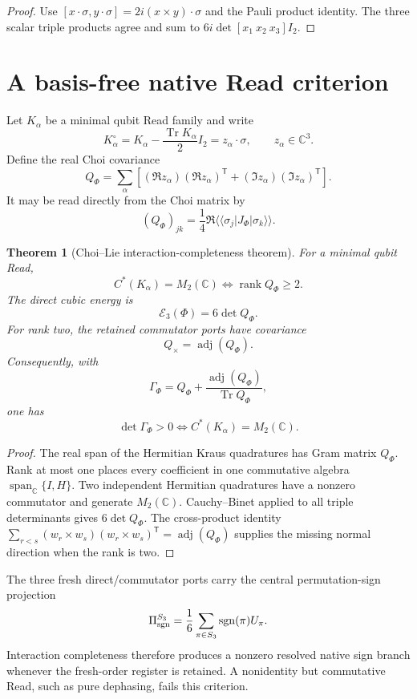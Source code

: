 \documentclass[11pt,oneside,openany]{book}
\numberwithin{equation}{chapter}
\newtheorem{theorem}{Theorem}[chapter]
\theoremstyle{definition}
\theoremstyle{remark}
\newcommand{\C}{\mathbb C}
\newcommand{\Tr}{\operatorname{Tr}}
\newcommand{\rank}{\operatorname{rank}}
\newcommand{\Span}{\operatorname{span}}
\newcommand{\sgn}{\operatorname{sgn}}
\newcommand{\adj}{\operatorname{adj}}
\begin{document}
\begin{proof}
Use \([x\cdot\sigma,y\cdot\sigma]=2i(x\times y)\cdot\sigma\) and the Pauli
product identity.  The three scalar triple products agree and sum to
\(6i\det[x_1\ x_2\ x_3]I_2\).
\end{proof}

\section{A basis-free native Read criterion}
Let \(K_\alpha\) be a minimal qubit Read family and write
\[
 K_\alpha^\circ
 =K_\alpha-\frac{\Tr K_\alpha}{2}I_2
 =z_\alpha\cdot\sigma,
 \qquad z_\alpha\in\C^3.
\]
Define the real Choi covariance
\[
 \boxed{
 Q_\Phi
 =\sum_\alpha\left[
 (\Re z_\alpha)(\Re z_\alpha)^{\mathsf T}
 +(\Im z_\alpha)(\Im z_\alpha)^{\mathsf T}
 \right].}
\]
It may be read directly from the Choi matrix by
\[
 (Q_\Phi)_{jk}
 =\frac14\Re\langle\!\langle\sigma_j|J_\Phi|\sigma_k\rangle\!\rangle.
\]

\begin{theorem}[Choi--Lie interaction-completeness theorem]
\label{thm:v5-choi-lie}
For a minimal qubit Read,
\[
 \boxed{C^*(K_\alpha)=M_2(\C)
 \iff \rank Q_\Phi\ge2.}
\]
The direct cubic energy is
\[
 \mathcal E_3(\Phi)=6\det Q_\Phi.
\]
For rank two, the retained commutator ports have covariance
\[
 Q_\times=\adj(Q_\Phi).
\]
Consequently, with
\[
 \Gamma_\Phi
 =Q_\Phi+\frac{\adj(Q_\Phi)}{\Tr Q_\Phi},
\]
one has
\[
 \boxed{
 \det\Gamma_\Phi>0
 \iff C^*(K_\alpha)=M_2(\C).}
\]
\end{theorem}

\begin{proof}
The real span of the Hermitian Kraus quadratures has Gram matrix \(Q_\Phi\).
Rank at most one places every coefficient in one commutative algebra
\(\Span_\C\{I,H\}\).  Two independent Hermitian quadratures have a nonzero
commutator and generate \(M_2(\C)\).  Cauchy--Binet applied to all triple
determinants gives \(6\det Q_\Phi\).  The cross-product identity
\(\sum_{r<s}(w_r\times w_s)(w_r\times w_s)^{\mathsf T}=\adj(Q_\Phi)\)
supplies the missing normal direction when the rank is two.
\end{proof}

The three fresh direct/commutator ports carry the central permutation-sign
projection
\[
 \Pi_{\rm sgn}^{S_3}
 =\frac16\sum_{\pi\in S_3}\sgn(\pi)U_\pi.
\]
Interaction completeness therefore produces a nonzero resolved native sign
branch whenever the fresh-order register is retained.  A nonidentity but
commutative Read, such as pure dephasing, fails this criterion.
\end{document}
